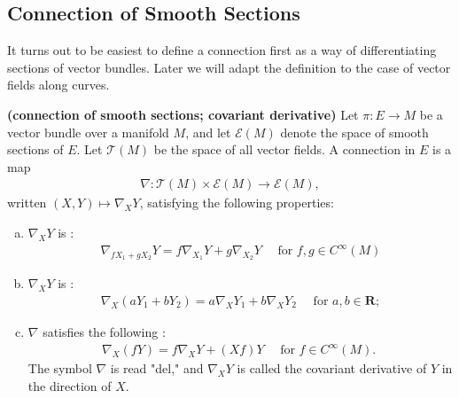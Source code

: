 \documentclass[12pt]{article} %
\newcommand{\bfs}[1]{\textbf{({#1}) }}
\begin{document}
\subsection{Connection of Smooth Sections}
It turns out to be easiest to define a connection first as a way of differentiating sections of vector bundles. Later we will adapt the definition to the case of vector fields along curves.
\begin{defa}\bfs{connection of smooth sections; covariant derivative}
Let $\pi: E \rightarrow M$ be a vector bundle over a manifold $M$, and let $\mathcal{E}(M)$ denote the space of smooth sections of $E$. Let $\mathcal{T}(M)$ be the space of all vector fields.  A connection in $E$ is a map
\begin{align*}
\nabla: \mathcal{T}(M) \times \mathcal{E}(M) \rightarrow \mathcal{E}(M),
\end{align*}
written $(X, Y) \mapsto \nabla_{X} Y$, satisfying the following properties:
\begin{enumerate}[(a)]
    \item $\nabla_{X} Y$ is :
\begin{align*}
\nabla_{f X_{1}+g X_{2}} Y=f \nabla_{X_{1}} Y+g \nabla_{X_{2}} Y \quad \text { for } f, g \in C^{\infty}(M)
\end{align*}
\item $\nabla_{X} Y$ is :
\begin{align*}
\nabla_{X}\left(a Y_{1}+b Y_{2}\right)=a \nabla_{X} Y_{1}+b \nabla_{X} Y_{2} \quad \text { for } a, b \in \mathbf{R} ;
\end{align*}
\item $\nabla$ satisfies the following :
\begin{align*}
\nabla_{X}(f Y)=f \nabla_{X} Y+(X f) Y \quad \text { for } f \in C^{\infty}(M) \text {. }
\end{align*}
The symbol $\nabla$ is read "del," and $\nabla_{X} Y$ is called the covariant derivative of $Y$ in the direction of $X$.
\end{enumerate}
\end{defa}
\end{document}
